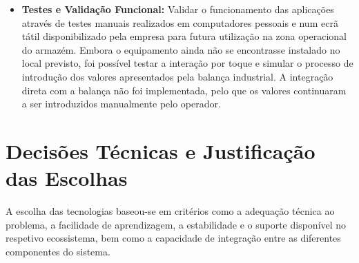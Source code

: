 \begin{itemize}
    \item \textbf{Testes e Validação Funcional:} Validar o funcionamento das aplicações através de testes manuais realizados em computadores pessoais e num ecrã tátil disponibilizado pela empresa para futura utilização na zona operacional do armazém. Embora o equipamento ainda não se encontrasse instalado no local previsto, foi possível testar a interação por toque e simular o processo de introdução dos valores apresentados pela balança industrial. A integração direta com a balança não foi implementada, pelo que os valores continuaram a ser introduzidos manualmente pelo operador.
\end{itemize}


\section{Decisões Técnicas e Justificação das Escolhas}\label{sec:tecnologias-escolhas}

A escolha das tecnologias baseou-se em critérios como a adequação técnica ao problema, a facilidade de aprendizagem, a estabilidade e o suporte disponível no respetivo ecossistema, bem como a capacidade de integração entre as diferentes componentes do sistema.


